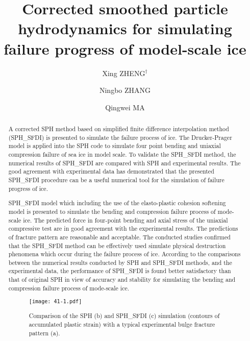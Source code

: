 \documentclass[10pt]{article}
\title{Corrected smoothed particle hydrodynamics for simulating
failure progress of model-scale ice}
\date{}
\author[1]{Xing ZHENG$^\dagger$}
\author[1]{Ningbo ZHANG}
\author[2]{Qingwei MA}
\affil[1]{Harbin Engineering University, China}
\affil[2]{City University London, UK}
\affil[$\relax$]{\email{\dagger}{zhengxing@hrbeu.edu.cn}}
\begin{document}
\maketitle


\begin{abstract}
A corrected SPH method based on simplified finite difference interpolation method (SPH\_SFDI) is presented to simulate the failure process of ice. The Drucker-Prager model is applied into the SPH code to simulate four point bending and uniaxial compression failure of sea ice in model scale. To validate the SPH\_SFDI method, the numerical results of SPH\_SFDI are compared with SPH and experimental results. The good agreement with experimental data has demonstrated that the presented SPH\_SFDI procedure can be a useful numerical tool for the simulation of failure progress of ice.

SPH\_SFDI model which including the use of the elasto-plastic cohesion softening model is presented to simulate the bending and compression failure process of mode-scale ice. The predicted force in four-point bending and axial stress of the uniaxial compressive test are in good agreement with the experimental results. The predictions of fracture pattern are reasonable and acceptable. The conducted studies confirmed that the SPH\_SFDI method can be effectively used simulate physical destruction phenomena which occur during the failure process of ice. According to the comparisons between the numerical results conducted by SPH and SPH\_SFDI methods, and the experimental data, the performance of SPH\_SFDI is found better satisfactory than that of original SPH in view of accuracy and stability for simulating the bending and compression failure process of mode-scale ice.

\begin{figure}[!htb]
\centering
\texttt{[image: 41-1.pdf]}
\caption{Comparison of the SPH (b) and SPH\_SFDI (c) simulation (contours of accumulated plastic strain) with a typical experimental bulge fracture pattern (a).}\label{fig:41}
\end{figure}

\end{abstract}



\addbib
\end{document}
